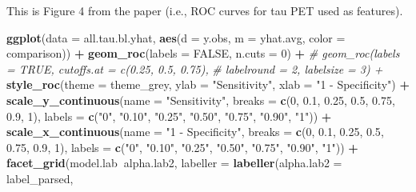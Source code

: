 \documentclass[
]{article}
\newenvironment{Shaded}{\begin{snugshade}}{\end{snugshade}}
\newcommand{\CommentTok}[1]{\textcolor[rgb]{0.56,0.35,0.01}{\textit{#1}}}
\newcommand{\DataTypeTok}[1]{\textcolor[rgb]{0.13,0.29,0.53}{#1}}
\newcommand{\DecValTok}[1]{\textcolor[rgb]{0.00,0.00,0.81}{#1}}
\newcommand{\FloatTok}[1]{\textcolor[rgb]{0.00,0.00,0.81}{#1}}
\newcommand{\KeywordTok}[1]{\textcolor[rgb]{0.13,0.29,0.53}{\textbf{#1}}}
\newcommand{\NormalTok}[1]{#1}
\newcommand{\OperatorTok}[1]{\textcolor[rgb]{0.81,0.36,0.00}{\textbf{#1}}}
\newcommand{\OtherTok}[1]{\textcolor[rgb]{0.56,0.35,0.01}{#1}}
\newcommand{\StringTok}[1]{\textcolor[rgb]{0.31,0.60,0.02}{#1}}
\begin{document}
This is Figure 4 from the paper (i.e., ROC curves for tau PET used as
features).

\begin{Shaded}
\begin{Highlighting}[]
\KeywordTok{ggplot}\NormalTok{(}\DataTypeTok{data =}\NormalTok{ all.tau.bl.yhat, }\KeywordTok{aes}\NormalTok{(}\DataTypeTok{d =}\NormalTok{ y.obs, }\DataTypeTok{m =}\NormalTok{ yhat.avg, }\DataTypeTok{color =}\NormalTok{ comparison)) }\OperatorTok{+}
\StringTok{  }\KeywordTok{geom_roc}\NormalTok{(}\DataTypeTok{labels =} \OtherTok{FALSE}\NormalTok{, }\DataTypeTok{n.cuts =} \DecValTok{0}\NormalTok{) }\OperatorTok{+}
\StringTok{  }\CommentTok{# geom_roc(labels = TRUE, cutoffs.at = c(0.25, 0.5, 0.75),}
\StringTok{  }\CommentTok{#          labelround = 2, labelsize = 3) +}
\StringTok{  }\KeywordTok{style_roc}\NormalTok{(}\DataTypeTok{theme =}\NormalTok{ theme_grey,}
            \DataTypeTok{ylab =} \StringTok{"Sensitivity"}\NormalTok{, }\DataTypeTok{xlab =} \StringTok{"1 - Specificity"}\NormalTok{) }\OperatorTok{+}
\StringTok{  }\KeywordTok{scale_y_continuous}\NormalTok{(}\DataTypeTok{name =} \StringTok{"Sensitivity"}\NormalTok{,}
                     \DataTypeTok{breaks =} \KeywordTok{c}\NormalTok{(}\DecValTok{0}\NormalTok{, }\FloatTok{0.1}\NormalTok{, }\FloatTok{0.25}\NormalTok{, }\FloatTok{0.5}\NormalTok{, }\FloatTok{0.75}\NormalTok{, }\FloatTok{0.9}\NormalTok{, }\DecValTok{1}\NormalTok{),}
                     \DataTypeTok{labels =} \KeywordTok{c}\NormalTok{(}\StringTok{"0"}\NormalTok{, }\StringTok{"0.10"}\NormalTok{, }\StringTok{"0.25"}\NormalTok{, }\StringTok{"0.50"}\NormalTok{, }\StringTok{"0.75"}\NormalTok{, }\StringTok{"0.90"}\NormalTok{, }\StringTok{"1"}\NormalTok{)) }\OperatorTok{+}
\StringTok{  }\KeywordTok{scale_x_continuous}\NormalTok{(}\DataTypeTok{name =} \StringTok{"1 - Specificity"}\NormalTok{,}
                     \DataTypeTok{breaks =} \KeywordTok{c}\NormalTok{(}\DecValTok{0}\NormalTok{, }\FloatTok{0.1}\NormalTok{, }\FloatTok{0.25}\NormalTok{, }\FloatTok{0.5}\NormalTok{, }\FloatTok{0.75}\NormalTok{, }\FloatTok{0.9}\NormalTok{, }\DecValTok{1}\NormalTok{),}
                     \DataTypeTok{labels =} \KeywordTok{c}\NormalTok{(}\StringTok{"0"}\NormalTok{, }\StringTok{"0.10"}\NormalTok{, }\StringTok{"0.25"}\NormalTok{, }\StringTok{"0.50"}\NormalTok{, }\StringTok{"0.75"}\NormalTok{, }\StringTok{"0.90"}\NormalTok{, }\StringTok{"1"}\NormalTok{)) }\OperatorTok{+}
\StringTok{  }\KeywordTok{facet_grid}\NormalTok{(model.lab}\OperatorTok{~}\NormalTok{alpha.lab2, }\DataTypeTok{labeller =} \KeywordTok{labeller}\NormalTok{(}\DataTypeTok{alpha.lab2 =}\NormalTok{ label_parsed,}

\end{Highlighting}
\end{Shaded}
\end{document}
